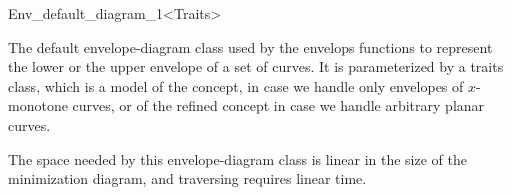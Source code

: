 
\ccRefPageBegin

\begin{ccRefClass}{Env_default_diagram_1<Traits>}

\ccDefinition

The default envelope-diagram class used by the envelops functions to represent
the lower or the upper envelope of a set of curves. It is parameterized by a
traits class, which is a model of the 
concept, in case we handle only envelopes of $x$-monotone curves, or of the
refined  concept in case we handle arbitrary planar
curves.

The space needed by this envelope-diagram class is linear in the size of
the minimization diagram, and traversing requires linear time.
 

\ccIsModel

\end{ccRefClass}

\ccRefPageEnd
